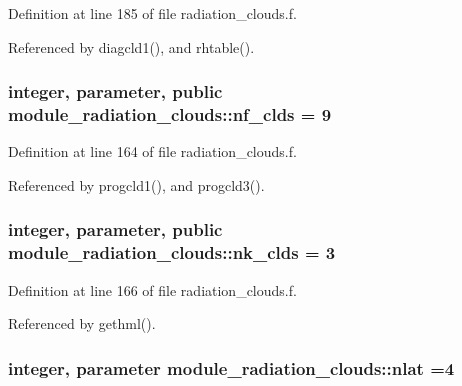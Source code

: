 Definition at line 185 of file radiation\+\_\+clouds.\+f.



Referenced by diagcld1(), and rhtable().

\subsubsection[{\texorpdfstring{nf\+\_\+clds}{nf_clds}}]{\setlength{\rightskip}{0pt plus 5cm}integer, parameter, public module\+\_\+radiation\+\_\+clouds\+::nf\+\_\+clds = 9}\hypertarget{namespacemodule__radiation__clouds_a66cf0f94619a3d865b0c593197a30576}{}\label{namespacemodule__radiation__clouds_a66cf0f94619a3d865b0c593197a30576}


Definition at line 164 of file radiation\+\_\+clouds.\+f.



Referenced by progcld1(), and progcld3().

\subsubsection[{\texorpdfstring{nk\+\_\+clds}{nk_clds}}]{\setlength{\rightskip}{0pt plus 5cm}integer, parameter, public module\+\_\+radiation\+\_\+clouds\+::nk\+\_\+clds = 3}\hypertarget{namespacemodule__radiation__clouds_a2739168b8205ee860eb8a160ea722a44}{}\label{namespacemodule__radiation__clouds_a2739168b8205ee860eb8a160ea722a44}


Definition at line 166 of file radiation\+\_\+clouds.\+f.



Referenced by gethml().

\subsubsection[{\texorpdfstring{nlat}{nlat}}]{\setlength{\rightskip}{0pt plus 5cm}integer, parameter module\+\_\+radiation\+\_\+clouds\+::nlat =4\hspace{0.3cm}{\ttfamily [private]}}\hypertarget{namespacemodule__radiation__clouds_ad4274cb223949e858ecc2e6346bed610}{}\label{namespacemodule__radiation__clouds_ad4274cb223949e858ecc2e6346bed610}


